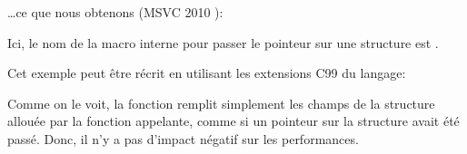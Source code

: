 \dots ce que nous obtenons (MSVC 2010 \Ox):



Ici, le nom de la macro interne pour passer le pointeur sur une structure est .

Cet exemple peut être récrit en utilisant les extensions C99 du langage:





Comme on le voit, la fonction remplit simplement les champs de la structure allouée
par la fonction appelante, comme si un pointeur sur la structure avait été passé.
Donc, il n'y a pas d'impact négatif sur les performances.
